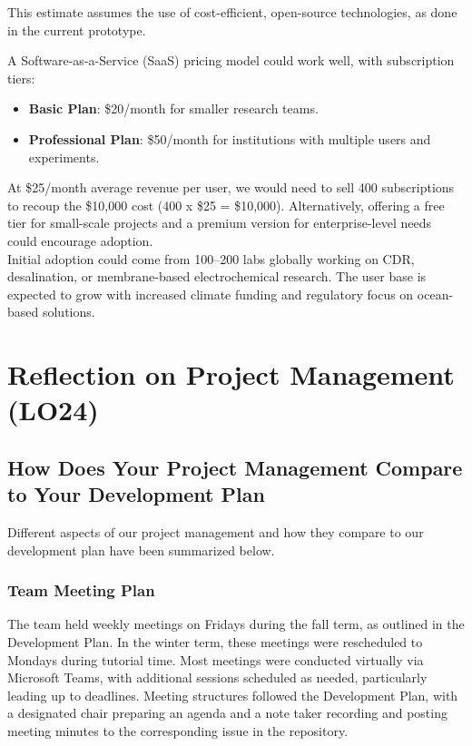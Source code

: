 \documentclass{article}
\begin{document}
This estimate assumes the use of cost-efficient, open-source technologies, as done in the current prototype.

A Software-as-a-Service (SaaS) pricing model could work well, with subscription tiers:
\begin{itemize}
    \item \textbf{Basic Plan}: \$20/month for smaller research teams.
    \item \textbf{Professional Plan}: \$50/month for institutions with multiple users and experiments.
\end{itemize}

At \$25/month average revenue per user, we would need to sell 400 subscriptions to recoup the \$10,000 cost 
(400 x \$25 = \$10,000). Alternatively, offering a free tier for small-scale projects and a premium version for 
enterprise-level needs could encourage adoption. \\

Initial adoption could come from 100–200 labs globally working on CDR, desalination, or membrane-based 
electrochemical research. The user base is expected to grow with increased climate funding and regulatory 
focus on ocean-based solutions.

\section{Reflection on Project Management (LO24)}

\subsection{How Does Your Project Management Compare to Your Development Plan}
Different aspects of our project management and how they compare to our development 
plan have been summarized below.

\subsubsection{Team Meeting Plan}
The team held weekly meetings on Fridays during the fall term, as outlined in
the Development Plan. In the winter term, these meetings were rescheduled to
Mondays during tutorial time. Most meetings were conducted virtually via
Microsoft Teams, with additional sessions scheduled as needed, particularly
leading up to deadlines. Meeting structures followed the Development Plan, with
a designated chair preparing an agenda and a note taker recording and posting
meeting minutes to the corresponding issue in the repository. \\
\end{document}

